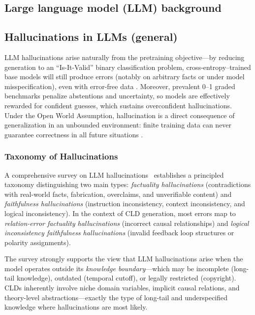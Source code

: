 \subsection{Large language model (LLM) background}
\label{sec:background_llms}





\subsection{Hallucinations in LLMs (general)}
\label{sec:background_hallucinations_general}

LLM hallucinations arise naturally from the pretraining objective---by reducing generation to an ``Is-It-Valid'' binary classification problem, cross-entropy--trained base models will still produce errors (notably on arbitrary facts or under model misspecification), even with error-free data \citep{kalai2025languagemodelshallucinate}. Moreover, prevalent 0--1 graded benchmarks penalize abstentions and uncertainty, so models are effectively rewarded for confident guesses, which sustains overconfident hallucinations. Under the Open World Assumption, hallucination is a direct consequence of generalization in an unbounded environment: finite training data can never guarantee correctness in all future situations \citep{xu2025hallucination}.

\subsubsection{Taxonomy of Hallucinations}

A comprehensive survey on LLM hallucinations~\citep{huang2025hallucination} establishes a principled taxonomy distinguishing two main types: \textit{factuality hallucinations} (contradictions with real-world facts, fabrication, overclaims, and unverifiable content) and \textit{faithfulness hallucinations} (instruction inconsistency, context inconsistency, and logical inconsistency). In the context of CLD generation, most errors map to \textit{relation-error factuality hallucinations} (incorrect causal relationships) and \textit{logical inconsistency faithfulness hallucinations} (invalid feedback loop structures or polarity assignments).

The survey strongly supports the view that LLM hallucinations arise when the model operates outside its \textit{knowledge boundary}---which may be incomplete (long-tail knowledge), outdated (temporal cutoff), or legally restricted (copyright). CLDs inherently involve niche domain variables, implicit causal relations, and theory-level abstractions---exactly the type of long-tail and underspecified knowledge where hallucinations are most likely.

